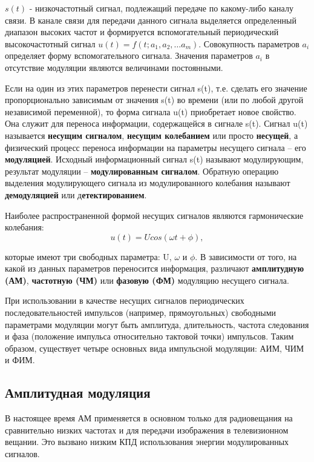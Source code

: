 \documentclass[12pt,a4paper]{scrartcl}
\begin{document}
$s(t)$ - низкочастотный сигнал, подлежащий передаче по какому-либо каналу связи. В канале связи для передачи данного сигнала выделяется определенный диапазон высоких частот и формируется вспомогательный периодический высокочастотный сигнал $u(t) = f(t; a_1, a_2, … a_m).$ Совокупность параметров $a_i$ определяет форму вспомогательного сигнала. Значения параметров $a_i$ в отсутствие модуляции являются величинами постоянными.

Если на один из этих параметров перенести сигнал s(t), т.е. сделать его значение пропорционально зависимым от значения s(t) во времени (или по любой другой независимой переменной), то форма сигнала u(t) приобретает новое свойство. Она служит для переноса информации, содержащейся в сигнале s(t). Сигнал u(t) называется \textbf{несущим сигналом}, \textbf{несущим колебанием} или просто \textbf{несущей}, а физический процесс переноса информации на параметры несущего сигнала – его \textbf{модуляцией}. Исходный информационный сигнал s(t) называют модулирующим, результат модуляции – \textbf{модулированным сигналом}. Обратную операцию выделения модулирующего сигнала из модулированного колебания называют \textbf{демодуляцией} или д\textbf{етектированием}.

Наиболее распространенной формой несущих сигналов являются гармонические колебания:
$$u(t)=Ucos(\omega t+\phi),$$

которые имеют три свободных параметра: U, $\omega$ и $\phi$. В зависимости от того, на какой из данных параметров переносится информация, различают \textbf{амплитудную (АМ)}, \textbf{частотную (ЧМ)} или \textbf{фазовую (ФМ)} модуляцию несущего сигнала.

При использовании в качестве несущих сигналов периодических последовательностей импульсов (например, прямоугольных) свободными параметрами модуляции могут быть амплитуда, длительность, частота следования и фаза (положение импульса относительно тактовой точки) импульсов. Таким образом, существует четыре основных вида импульсной модуляции: АИМ, ЧИМ и ФИМ.

\subsection{Амплитудная модуляция}
\label{sec:AM}

В настоящее время АМ применяется в основном только для радиовещания на сравнительно низких частотах и для передачи изображения в телевизионном вещании. Это вызвано низким КПД использования энергии модулированных сигналов.
\end{document}
